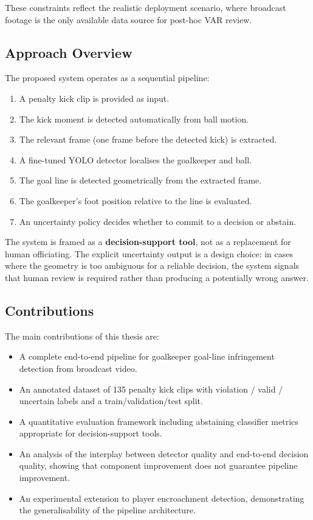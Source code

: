 \documentclass[12pt,a4paper,twoside]{article}
\begin{document}
These constraints reflect the realistic deployment scenario, where broadcast
footage is the only available data source for post-hoc VAR review.

\subsection{Approach Overview}

The proposed system operates as a sequential pipeline:
\begin{enumerate}
  \item A penalty kick clip is provided as input.
  \item The kick moment is detected automatically from ball motion.
  \item The relevant frame (one frame before the detected kick) is extracted.
  \item A fine-tuned YOLO detector localises the goalkeeper and ball.
  \item The goal line is detected geometrically from the extracted frame.
  \item The goalkeeper's foot position relative to the line is evaluated.
  \item An uncertainty policy decides whether to commit to a decision or abstain.
\end{enumerate}

The system is framed as a \textbf{decision-support tool}, not as a replacement
for human officiating. The explicit uncertainty output is a design choice: in
cases where the geometry is too ambiguous for a reliable decision, the system
signals that human review is required rather than producing a potentially
wrong answer.

\subsection{Contributions}

The main contributions of this thesis are:

\begin{itemize}
  \item A complete end-to-end pipeline for goalkeeper goal-line infringement
        detection from broadcast video.
  \item An annotated dataset of 135 penalty kick clips with violation / valid /
        uncertain labels and a train/validation/test split.
  \item A quantitative evaluation framework including abstaining classifier
        metrics appropriate for decision-support tools.
  \item An analysis of the interplay between detector quality and end-to-end
        decision quality, showing that component improvement does not guarantee
        pipeline improvement.
  \item An experimental extension to player encroachment detection, demonstrating
        the generalisability of the pipeline architecture.
\end{itemize}
\end{document}
